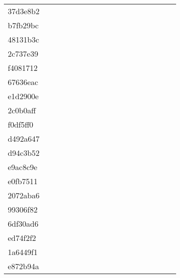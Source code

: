 \begin{table*}[htb]
\begin{tabular}{l|ccccccccccccccccc}
37d3e8b2  & \C & \X & \X & \X & \X & \X & \X & \X & \X & \X & \X & \X & \X & \C & \C & \X & \X\\
b7fb29bc  & \C & \X & \X & \X & \X & \X & \X & \X & \X & \X & \X & \X & \X & \C & \C & \X & \X\\
48131b3c  & \C & \X & \X & \X & \X & \X & \X & \C & \C & \C & \C & \C & \C & \C & \C & \C & \C\\
2c737e39  & \C & \X & \X & \X & \X & \X & \X & \X & \X & \X & \X & \X & \X & \C & \C & \X & \X\\
f4081712  & \C & \X & \X & \X & \X & \X & \X & \X & \X & \X & \X & \X & \X & \C & \C & \X & \X\\
67636eac  & \C & \X & \X & \X & \X & \X & \X & \X & \X & \X & \C & \C & \X & \C & \C & \C & \C\\
e1d2900e  & \X & \X & \X & \X & \X & \X & \X & \X & \X & \X & \X & \X & \X & \X & \X & \X & \X\\
2c0b0aff  & \C & \X & \X & \X & \X & \C & \X & \X & \X & \X & \X & \X & \C & \X & \C & \C & \X\\
f0df5ff0  & \C & \X & \X & \X & \X & \X & \X & \X & \X & \X & \X & \X & \X & \C & \C & \C & \C\\
d492a647  & \C & \X & \X & \X & \X & \X & \X & \X & \X & \X & \X & \X & \X & \C & \C & \X & \X\\
d94c3b52  & \X & \X & \X & \X & \X & \X & \X & \X & \X & \X & \X & \X & \X & \X & \X & \X & \X\\
e9ac8c9e  & \C & \X & \X & \X & \X & \X & \X & \X & \C & \X & \C & \C & \C & \C & \C & \X & \X\\
e0fb7511  & \C & \X & \X & \X & \X & \X & \X & \X & \X & \X & \X & \X & \X & \C & \C & \C & \C\\
2072aba6  & \C & \C & \C & \X & \X & \C & \C & \C & \C & \C & \C & \C & \C & \C & \C & \C & \C\\
99306f82  & \C & \X & \C & \X & \X & \X & \X & \C & \X & \X & \C & \C & \C & \C & \C & \C & \C\\
6df30ad6  & \C & \X & \C & \X & \X & \X & \X & \X & \X & \X & \X & \C & \X & \C & \C & \C & \C\\
ed74f2f2  & \C & \X & \X & \X & \X & \C & \X & \X & \X & \X & \X & \X & \X & \C & \C & \X & \X\\
1a6449f1  & \C & \X & \X & \X & \X & \X & \X & \X & \X & \X & \X & \X & \X & \C & \C & \C & \X\\
e872b94a  & \C & \C & \X & \X & \X & \X & \X & \X & \X & \X & \C & \C & \C & \C & \C & \X & \C\\

\end{tabular}
\end{table*}
